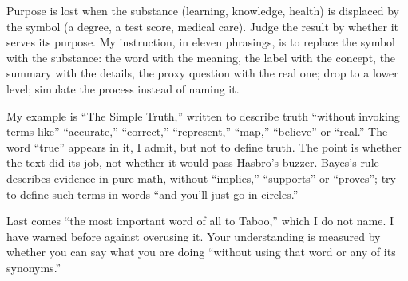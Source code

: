 Purpose is lost when the substance (learning, knowledge, health) is displaced by the symbol (a degree, a test score, medical care). Judge the result by whether it serves its purpose. My instruction, in eleven phrasings, is to replace the symbol with the substance: the word with the meaning, the label with the concept, the summary with the details, the proxy question with the real one; drop to a lower level; simulate the process instead of naming it.

My example is ``The Simple Truth,'' written to describe truth ``without invoking terms like'' ``accurate,'' ``correct,'' ``represent,'' ``map,'' ``believe'' or ``real.'' The word ``true'' appears in it, I admit, but not to define truth.  The point is whether the text did its job, not whether it would pass Hasbro's buzzer. Bayes's rule describes evidence in pure math, without ``implies,'' ``supports'' or ``proves''; try to define such terms in words ``and you'll just go in circles.''

Last comes ``the most important word of all to Taboo,'' which I do not name. I have warned before against overusing it. Your understanding is measured by whether you can say what you are doing ``without using that word or any of its synonyms.''
